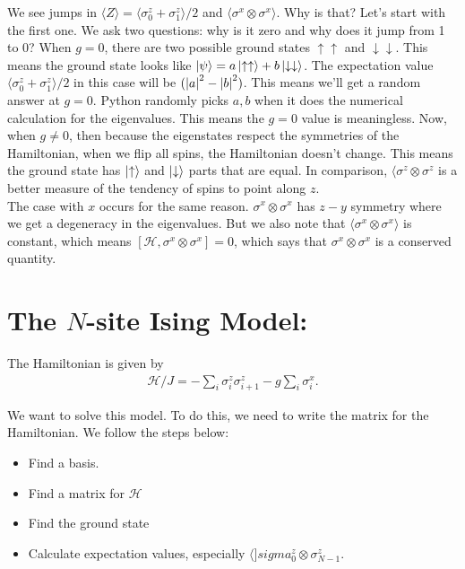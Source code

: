 \documentclass{book}
\theoremstyle{definition}
\newcommand{\had}{\mathcal{H}}
\begin{document}
We see jumps in $\langle Z \rangle = \langle \sigma^z_0 + \sigma^z_1\rangle/2$ and $\langle \sigma^x\otimes \sigma^x\rangle$. Why is that? Let's start with the first one. We ask two questions: why is it zero and why does it jump from 1 to 0? When $g=0$, there are two possible ground states $\uparrow\uparrow$ and $\downarrow\downarrow$. This means the ground state looks like $\ket{\psi} = a\ket{\uparrow\uparrow} + b\ket{\downarrow\downarrow}$. The expectation value $\langle \sigma_0^z + \sigma_1^z \rangle/2$ in this case will be $(\abs{a}^2 - \abs{b}^2)$. This means we'll get a random answer at $g=0$. Python randomly picks $a,b$ when it does the numerical calculation for the eigenvalues. This means the $g=0$ value is meaningless. Now, when $g\neq 0$, then because the eigenstates respect the symmetries of the Hamiltonian, when we flip all spins, the Hamiltonian doesn't change. This means the ground state has $\ket{\uparrow}$ and $\ket{\downarrow}$ parts that are equal. In comparison, $\langle \sigma^z \otimes \sigma^z$ is a better measure of the tendency of spins to point along $z$. \\

The case with $x$ occurs for the same reason. $\sigma^x\otimes \sigma^x$ has $z-y$ symmetry where we get a degeneracy in the eigenvalues. But we also note that $\langle \sigma^x \otimes \sigma^x\rangle$ is constant, which means $[\had,\sigma^x \otimes \sigma^x ]=0$, which says that $\sigma^x \otimes \sigma^x$ is a conserved quantity.  









\section{The $N$-site Ising Model:}

The Hamiltonian is given by
\begin{align}
\had/J =-\sum_i \sigma_i^z \sigma_{i+1}^z - g \sum_i \sigma_i^x. 
\end{align}

We want to solve this model. To do this, we need to write the matrix for the Hamiltonian. We follow the steps below:
\begin{itemize}
	\item Find a basis. 
	\item Find a matrix for $\had$
	\item Find the ground state
	\item Calculate expectation values, especially $\langle ]sigma_0^z \otimes \sigma_{N-1}^z$.
\end{itemize}
\end{document}
